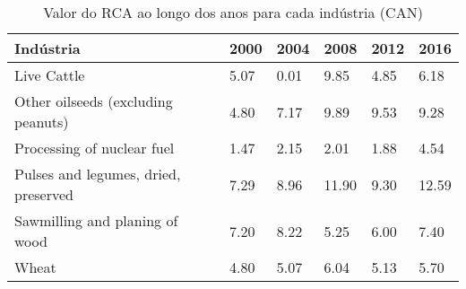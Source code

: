 \begin{table}
\centering
\caption{Valor do RCA ao longo dos anos para cada indústria (CAN)}
\begin{tabular}{p{6cm}p{1.5cm}p{1.5cm}p{1.5cm}p{1.5cm}p{1.5cm}}
\toprule
                           Indústria & 2000 & 2004 &  2008 & 2012 &  2016 \\
\midrule
                         Live Cattle & 5.07 & 0.01 &  9.85 & 4.85 &  6.18 \\
  Other oilseeds (excluding peanuts) & 4.80 & 7.17 &  9.89 & 9.53 &  9.28 \\
          Processing of nuclear fuel & 1.47 & 2.15 &  2.01 & 1.88 &  4.54 \\
Pulses and legumes, dried, preserved & 7.29 & 8.96 & 11.90 & 9.30 & 12.59 \\
      Sawmilling and planing of wood & 7.20 & 8.22 &  5.25 & 6.00 &  7.40 \\
                               Wheat & 4.80 & 5.07 &  6.04 & 5.13 &  5.70 \\
\bottomrule
\end{tabular}
\end{table}
